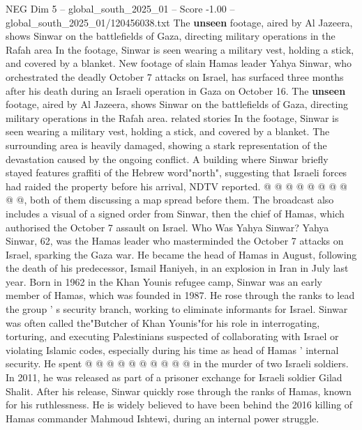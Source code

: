 \begin{textsample}{NEG Dim 5 – global\_south\_2025\_01 – Score -1.00 – global\_south\_2025\_01/120456038.txt}  \label{ex:f5_neg_103}
The \textbf{unseen} footage, aired by Al Jazeera, shows Sinwar on the battlefields of Gaza, directing military operations in the Rafah area In the footage, Sinwar is seen wearing a military vest, holding a stick, and covered by a blanket.
New footage of slain Hamas leader Yahya Sinwar, who orchestrated the deadly October 7 attacks on Israel, has surfaced three months after his death during an Israeli operation in Gaza on October 16.
The \textbf{unseen} footage, aired by Al Jazeera, shows Sinwar on the battlefields of Gaza, directing military operations in the Rafah area. related stories In the footage, Sinwar is seen wearing a military vest, holding a stick, and covered by a blanket.
The surrounding area is heavily damaged, showing a stark representation of the devastation caused by the ongoing conflict.
A building where Sinwar briefly stayed features graffiti of the Hebrew word"north", suggesting that Israeli forces had raided the property before his arrival, NDTV reported. @ @ @ @ @ @ @ @ @ @, both of them discussing a map spread before them.
The broadcast also includes a visual of a signed order from Sinwar, then the chief of Hamas, which authorised the October 7 assault on Israel.
Who Was Yahya Sinwar?
Yahya Sinwar, 62, was the Hamas leader who masterminded the October 7 attacks on Israel, sparking the Gaza war.
He became the head of Hamas in August, following the death of his predecessor, Ismail Haniyeh, in an explosion in Iran in July last year.
Born in 1962 in the Khan Younis refugee camp, Sinwar was an early member of Hamas, which was founded in 1987.
He rose through the ranks to lead the group ' s security branch, working to eliminate informants for Israel.
Sinwar was often called the"Butcher of Khan Younis"for his role in interrogating, torturing, and executing Palestinians suspected of collaborating with Israel or violating Islamic codes, especially during his time as head of Hamas ' internal security.
He spent @ @ @ @ @ @ @ @ @ @ in the murder of two Israeli soldiers.
In 2011, he was released as part of a prisoner exchange for Israeli soldier Gilad Shalit.
After his release, Sinwar quickly rose through the ranks of Hamas, known for his ruthlessness.
He is widely believed to have been behind the 2016 killing of Hamas commander Mahmoud Ishtewi, during an internal power struggle.

\end{textsample}
